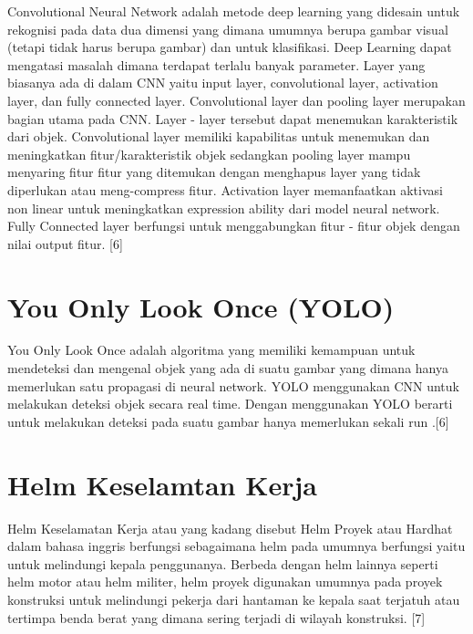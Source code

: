 Convolutional Neural Network adalah metode deep learning yang didesain untuk rekognisi pada data dua dimensi yang dimana umumnya berupa gambar visual (tetapi tidak harus berupa gambar) dan untuk klasifikasi. Deep Learning dapat mengatasi masalah dimana terdapat terlalu banyak parameter.  Layer yang biasanya ada di dalam CNN yaitu input layer, convolutional layer, activation layer, dan fully connected layer.
Convolutional layer dan pooling layer merupakan bagian utama pada CNN. Layer - layer tersebut dapat menemukan karakteristik dari objek. Convolutional layer memiliki kapabilitas untuk menemukan dan meningkatkan fitur/karakteristik objek sedangkan pooling layer mampu menyaring fitur fitur yang ditemukan dengan menghapus layer yang tidak diperlukan atau meng-compress fitur. Activation layer memanfaatkan aktivasi non linear untuk meningkatkan expression ability dari model neural network. Fully Connected layer berfungsi untuk menggabungkan fitur - fitur objek dengan nilai output fitur. [6]

\section{You Only Look Once (YOLO)}
\label{sec:youonlylookone}

You Only Look Once adalah algoritma yang memiliki kemampuan untuk mendeteksi dan mengenal objek yang ada di suatu gambar yang dimana hanya memerlukan satu propagasi di neural network. YOLO menggunakan CNN untuk melakukan deteksi objek secara real time. Dengan menggunakan YOLO berarti untuk melakukan deteksi pada suatu gambar hanya memerlukan sekali run .[6]

\section{Helm Keselamtan Kerja}
\label{sec:helmkeselamatankerja}

Helm Keselamatan Kerja atau yang kadang disebut Helm Proyek atau Hardhat  dalam bahasa inggris berfungsi sebagaimana helm pada umumnya berfungsi yaitu untuk melindungi kepala penggunanya. Berbeda dengan helm lainnya seperti helm motor atau helm militer, helm proyek digunakan umumnya pada proyek konstruksi untuk melindungi pekerja dari hantaman ke kepala saat terjatuh atau tertimpa benda berat yang dimana sering terjadi di wilayah konstruksi. [7]